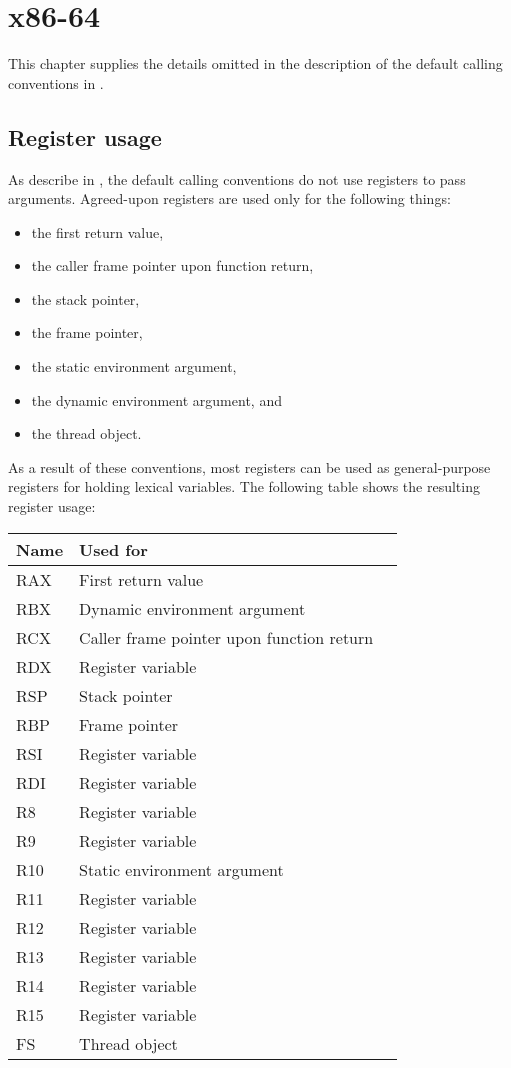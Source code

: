 \chapter{x86-64}
\label{chapter-backend-x86-64-new}

This chapter supplies the details omitted in the description of the
default calling conventions in .

\section{Register usage}
\label{sec-backend-x86-64-new-register-use}

As describe in , the default calling
conventions do not use registers to pass arguments.  Agreed-upon
registers are used only for the following things:

\begin{itemize}
\item the first return value,
\item the caller frame pointer upon function return,
\item the stack pointer,
\item the frame pointer,
\item the static environment argument,
\item the dynamic environment argument, and
\item the thread object.
\end{itemize}

As a result of these conventions, most registers can be used as
general-purpose registers for holding lexical variables.  The
following table shows the resulting register usage:

\begin{tabular}{|l|l|l|}
\hline
Name & Used for\\
\hline
\hline
RAX & First return value\\
RBX & Dynamic environment argument\\
RCX & Caller frame pointer upon function return\\
RDX & Register variable\\
RSP & Stack pointer \\
RBP & Frame pointer \\
RSI & Register variable\\
RDI & Register variable\\
R8  & Register variable\\
R9  & Register variable\\
R10 & Static environment argument\\
R11 & Register variable\\
R12 & Register variable\\
R13 & Register variable\\
R14 & Register variable\\
R15 & Register variable\\
FS  & Thread object\\
\hline
\end{tabular}

